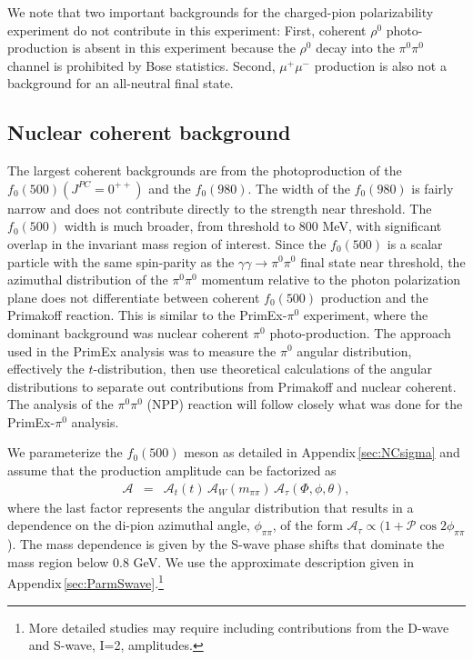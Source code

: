 We note that two important backgrounds for the charged-pion
polarizability experiment do not contribute in this experiment: First,
coherent $\rho^0$ photo-production is absent in this experiment
because the $\rho^0$ decay into the $\pi^0\pi^0$ channel is prohibited
by Bose statistics.  Second, $\mu^+\mu^-$ production is also not a
background for an all-neutral final state.

\subsection{Nuclear coherent background \label{sec:NCback}}
   
The largest coherent backgrounds are  
from the photoproduction of the $f_0(500)(J^{PC}=0^{++})$ and the $f_0(980)$.
The width of the
$f_0(980)$ is fairly narrow and does not contribute directly to the strength
near threshold.
The $f_0(500)$ width is much
broader, from threshold to 800 MeV, with significant overlap in the
invariant mass region of interest.  Since the $f_0(500)$ is a scalar
particle with the same spin-parity as the $\gamma \gamma \rightarrow
\pi^0\pi^0$ final state near threshold, the azimuthal distribution of the
$\pi^0\pi^0$ momentum relative to the
photon polarization plane does not differentiate between coherent
$f_0(500)$ production and the Primakoff reaction.  
This is similar to the PrimEx-$\pi^0$ experiment, where the dominant background
was
nuclear coherent $\pi^0$ photo-production.  The approach used in the
PrimEx analysis was to measure the $\pi^0$ angular distribution,
effectively the $t$-distribution, then use theoretical calculations of
the angular distributions to separate out contributions from Primakoff
and nuclear coherent. The analysis of the $\pi^0\pi^0$ (NPP) reaction
will follow closely what was done for the PrimEx-$\pi^0$
analysis.  

We parameterize the $f_{0}(500)$ meson as detailed in
Appendix\,\ref{sec:NCsigma} and assume that the production amplitude
can be factorized as
\begin{eqnarray}
\mathcal{A} & = & \mathcal{A}_t(t) \, \mathcal{A}_W(m_{\pi\pi}) \, \mathcal{A}_\tau(\Phi, \phi, \theta),
\end{eqnarray}
where the last factor represents the angular distribution that results
in a dependence on the di-pion azimuthal angle, $\phi_{\pi\pi}$, of
the form $\mathcal{A}_\tau \propto (1 + \mathcal{P}
\cos{2\phi_{\pi\pi}}$).  The mass dependence is given by the S-wave
phase shifts that dominate the mass region below 0.8 GeV. We use the
approximate description given in
Appendix\,\ref{sec:ParmSwave}.\footnote{More detailed studies may
  require including contributions from the D-wave and S-wave, I=2,
  amplitudes.}

